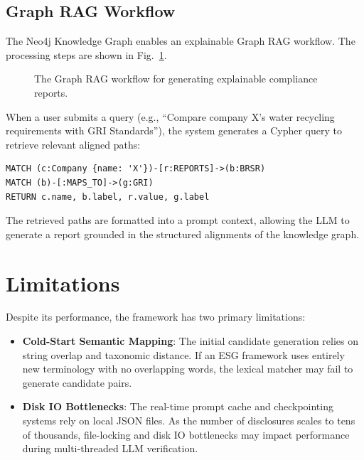 \documentclass[journal,compsoc]{IEEEtran}
\begin{document}
\begin{itemize}
\begin{table}[t]
\begin{itemize}
\begin{table}[t]
\subsection{Graph RAG Workflow}
The Neo4j Knowledge Graph enables an explainable Graph RAG workflow. The processing steps are shown in Fig.~\ref{fig:rag_work}.

\begin{figure}[h]
\centering
{}
\caption{The Graph RAG workflow for generating explainable compliance reports.}
\label{fig:rag_work}
\end{figure}

When a user submits a query (e.g., ``Compare company X's water recycling requirements with GRI Standards''), the system generates a Cypher query to retrieve relevant aligned paths:
\begin{verbatim}
MATCH (c:Company {name: 'X'})-[r:REPORTS]->(b:BRSR)
MATCH (b)-[:MAPS_TO]->(g:GRI)
RETURN c.name, b.label, r.value, g.label
\end{verbatim}
The retrieved paths are formatted into a prompt context, allowing the LLM to generate a report grounded in the structured alignments of the knowledge graph.

\section{Limitations}
Despite its performance, the framework has two primary limitations:
\begin{itemize}
    \item \textbf{Cold-Start Semantic Mapping}: The initial candidate generation relies on string overlap and taxonomic distance. If an ESG framework uses entirely new terminology with no overlapping words, the lexical matcher may fail to generate candidate pairs.
    \item \textbf{Disk IO Bottlenecks}: The real-time prompt cache and checkpointing systems rely on local JSON files. As the number of disclosures scales to tens of thousands, file-locking and disk IO bottlenecks may impact performance during multi-threaded LLM verification.
\end{itemize}


\end{table}
\end{itemize}
\end{table}
\end{itemize}
\end{document}
